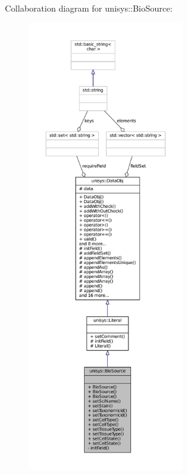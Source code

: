 Collaboration diagram for unisys\-:\-:Bio\-Source\-:
\nopagebreak
\begin{figure}[H]
\begin{center}
\leavevmode
\includegraphics[height=550pt]{classunisys_1_1BioSource__coll__graph}
\end{center}
\end{figure}
